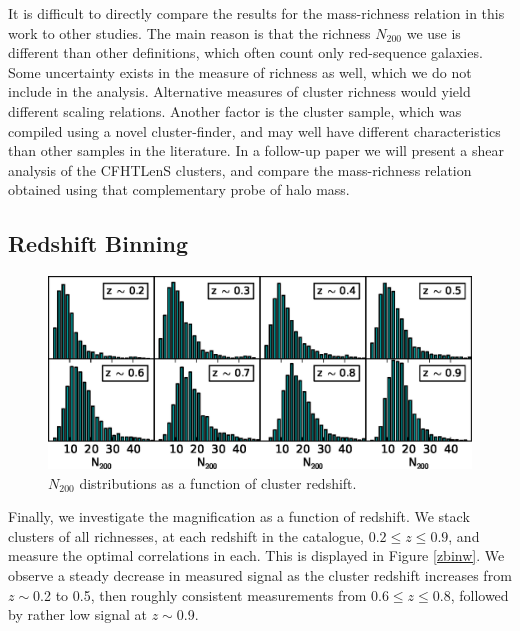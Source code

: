 It is difficult to directly compare the results for the mass-richness relation in this work to other studies. The main reason is that the richness $N_{200}$ we use is different than other definitions, which often count only red-sequence galaxies. Some uncertainty exists in the measure of richness as well, which we do not include in the analysis. Alternative measures of cluster richness would yield different scaling relations. Another factor is the cluster sample, which was compiled using a novel cluster-finder, and may well have different characteristics than other samples in the literature. In a follow-up paper we will present a shear analysis of the \ac{CFHTLenS} clusters, and compare the mass-richness relation obtained using that complementary probe of halo mass.


\subsection{Redshift Binning}
\label{zbin}

\begin{figure}
\begin{center}
\includegraphics[scale=1.0]{plots_ch3/zbin_histograms.eps}
\caption[Richness Distributions in Redshift Bins]{$N_{200}$ distributions as a function of cluster redshift.}
\label{zbinhist}
\end{center}
\end{figure}

Finally, we investigate the magnification as a function of redshift. We stack clusters of all richnesses, at each redshift in the catalogue, $0.2 \leq z \leq 0.9$, and measure the optimal correlations in each. This is displayed in Figure \ref{zbinw}. We observe a steady decrease in measured signal as the cluster redshift increases from $z \sim$0.2 to 0.5, then roughly consistent measurements from 0.6$\leq z \leq$0.8, followed by rather low signal at $z \sim$0.9. 

